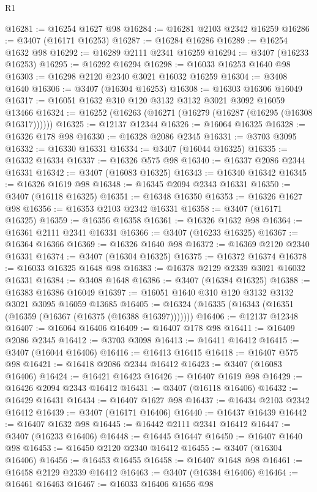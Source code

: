 \begin{lexlean}{R1}
\begin{coremodule}
@16281 := @16254 @1627 @98
@16284 := @16281 @2103 @2342 @16259
@16286 := @3407 (@16171 @16253)
@16287 := @16284 @16286
@16289 := @16254 @1632 @98
@16292 := @16289 @2111 @2341 @16259
@16294 := @3407 (@16233 @16253)
@16295 := @16292 @16294
@16298 := @16033 @16253 @1640 @98
@16303 := @16298 @2120 @2340 @3021 @16032 @16259
@16304 := @3408 @1640
@16306 := @3407 (@16304 @16253)
@16308 := @16303 @16306 @16049
@16317 := @16051 @1632 @310 @120 @3132 @3132 @3021 @3092 @16059 @13466
@16324 := @16252 (@16263 (@16271 (@16279 (@16287 (@16295 (@16308 @16317))))))
@16325 := @12137 @12344
@16326 := @16064 @16325
@16328 := @16326 @178 @98
@16330 := @16328 @2086 @2345
@16331 := @3703 @3095
@16332 := @16330 @16331
@16334 := @3407 (@16044 @16325)
@16335 := @16332 @16334
@16337 := @16326 @575 @98
@16340 := @16337 @2086 @2344 @16331
@16342 := @3407 (@16083 @16325)
@16343 := @16340 @16342
@16345 := @16326 @1619 @98
@16348 := @16345 @2094 @2343 @16331
@16350 := @3407 (@16118 @16325)
@16351 := @16348 @16350
@16353 := @16326 @1627 @98
@16356 := @16353 @2103 @2342 @16331
@16358 := @3407 (@16171 @16325)
@16359 := @16356 @16358
@16361 := @16326 @1632 @98
@16364 := @16361 @2111 @2341 @16331
@16366 := @3407 (@16233 @16325)
@16367 := @16364 @16366
@16369 := @16326 @1640 @98
@16372 := @16369 @2120 @2340 @16331
@16374 := @3407 (@16304 @16325)
@16375 := @16372 @16374
@16378 := @16033 @16325 @1648 @98
@16383 := @16378 @2129 @2339 @3021 @16032 @16331
@16384 := @3408 @1648
@16386 := @3407 (@16384 @16325)
@16388 := @16383 @16386 @16049
@16397 := @16051 @1640 @310 @120 @3132 @3132 @3021 @3095 @16059 @13685
@16405 := @16324 (@16335 (@16343 (@16351 (@16359 (@16367 (@16375 (@16388 @16397)))))))
@16406 := @12137 @12348
@16407 := @16064 @16406
@16409 := @16407 @178 @98
@16411 := @16409 @2086 @2345
@16412 := @3703 @3098
@16413 := @16411 @16412
@16415 := @3407 (@16044 @16406)
@16416 := @16413 @16415
@16418 := @16407 @575 @98
@16421 := @16418 @2086 @2344 @16412
@16423 := @3407 (@16083 @16406)
@16424 := @16421 @16423
@16426 := @16407 @1619 @98
@16429 := @16426 @2094 @2343 @16412
@16431 := @3407 (@16118 @16406)
@16432 := @16429 @16431
@16434 := @16407 @1627 @98
@16437 := @16434 @2103 @2342 @16412
@16439 := @3407 (@16171 @16406)
@16440 := @16437 @16439
@16442 := @16407 @1632 @98
@16445 := @16442 @2111 @2341 @16412
@16447 := @3407 (@16233 @16406)
@16448 := @16445 @16447
@16450 := @16407 @1640 @98
@16453 := @16450 @2120 @2340 @16412
@16455 := @3407 (@16304 @16406)
@16456 := @16453 @16455
@16458 := @16407 @1648 @98
@16461 := @16458 @2129 @2339 @16412
@16463 := @3407 (@16384 @16406)
@16464 := @16461 @16463
@16467 := @16033 @16406 @1656 @98

\end{coremodule}
\end{lexlean}
